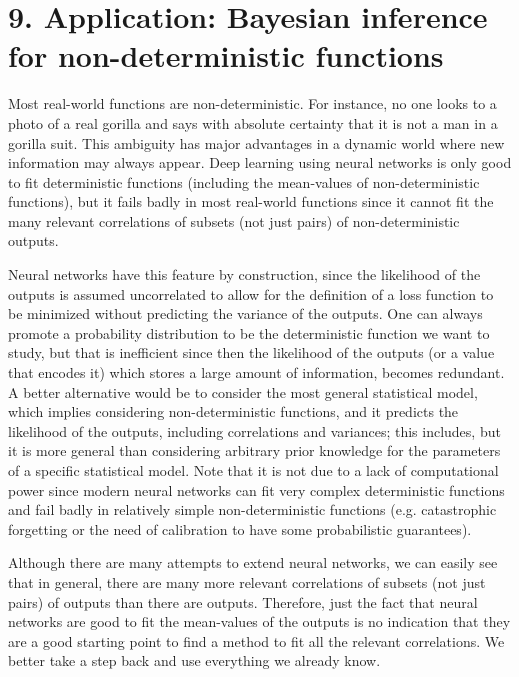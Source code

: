 \documentclass[11pt]{book}
\begin{document}
\hypertarget{application-bayesian-inference-for-non-deterministic-functions}{%
\section{9. Application: Bayesian inference for non-deterministic
functions}\label{application-bayesian-inference-for-non-deterministic-functions}}

Most real-world functions are non-deterministic. For instance, no one
looks to a photo of a real gorilla and says with absolute certainty that
it is not a man in a gorilla suit. This ambiguity has major advantages
in a dynamic world where new information may always appear. Deep
learning using neural networks is only good to fit deterministic
functions (including the mean-values of non-deterministic functions),
but it fails badly in most real-world
functions\cite{lakshminarayanan_simple_2017} since it cannot fit the many relevant correlations of
subsets (not just pairs) of non-deterministic outputs.

Neural networks have this feature by construction, since the likelihood
of the outputs is assumed uncorrelated to allow for the definition of a
loss function to be minimized without predicting the variance of the
outputs. One can always promote a probability distribution to be the
deterministic function we want to study, but that is inefficient since
then the likelihood of the outputs (or a value that encodes
it\cite{bojun_utility-probability_2023}) which stores a large amount of information, becomes redundant. A
better alternative would be to consider the most general statistical
model, which implies considering non-deterministic functions, and it
predicts the likelihood of the
outputs\cite{dupont_data_2022},
including correlations and variances; this includes, but it is more
general than considering arbitrary prior knowledge for the parameters of
a specific statistical
model\cite{muller_transformers_2022}. Note that it is not due to a lack of computational power since
modern neural networks can fit very complex deterministic functions and
fail
badly\cite{lakshminarayanan_simple_2017}\cite{de_grancey_object_2022} in relatively simple non-deterministic functions (e.g.
catastrophic forgetting or the need of calibration to have some
probabilistic
guarantees\cite{de_grancey_object_2022}).

Although there are many attempts to extend neural
networks\cite{lakshminarayanan_simple_2017}\cite{muller_transformers_2022}\cite{de_grancey_object_2022}\cite{egele_autodeuq_2022}, we can easily see that in general, there are many more relevant
correlations of subsets (not just pairs) of outputs than there are
outputs. Therefore, just the fact that neural networks are good to fit
the mean-values of the outputs is no indication that they are a good
starting point to find a method to fit all the relevant correlations. We
better take a step back and use everything we already know.
\end{document}
